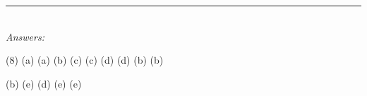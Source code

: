 \documentclass[main.tex]{subfiles}
\begin{document}
\begin{fullwidth}
\par\noindent\rule{0.5\textwidth}{0.4pt}\\
\emph{Answers:}\\
\vspace{-0.5cm}
\begin{tasks}[counter-format={tsk[1].}, label-align=left, label-offset={0mm}, label-width={5mm}, item-indent={1mm}, label-format={\bfseries}](8)
\task (a) 
\task (a) 
\task (b) 
\task (c) 
\task (c) 
\task (d) 
\task (d)
\task (b) 
\task (b)

\task (b) 
\task (e) 
\task (d) 
\task (e) 
\task (e)






\end{tasks}






\end{fullwidth}
\restoregeometry
\end{document}
